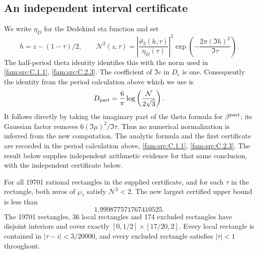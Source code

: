 \subsection{An independent interval certificate}\hypertarget{tag-034N}{}\label{push:section:E.4}
\label{sec:e4}

We write $\eta_D$ for the Dedekind eta function and set
\[
 h=z-(1-\tau)/2,\qquad
 \mathcal N^2(z,\tau)=
 \left|\frac{\vartheta_3(h,\tau)}{\eta_D(\tau)}\right|^2
 \exp\left(-\frac{2\pi(\Im h)^2}{\Im\tau}\right).
\]
The half-period theta identity identifies this with the norm used in
\cref{fam:src:C.1.1}, \cref{fam:src:C.2.3}. The coefficient of $\Im c$ in $D_c$ is one. Consequently the
identity from the period calculation above which we use is
\[
 D_{\rm part}=\frac6\pi
 \log\left(\frac{\mathcal N}{2\sqrt3}\right).
\]
It follows directly by taking the imaginary part of the theta formula
for $\beta^{\rm part}$; its Gaussian factor removes
$6(\Im\mu)^2/\Im\tau$. Thus no numerical normalization is inferred
from the new computation. The analytic formula and the first
certificate are recorded in the period calculation above, \cref{fam:src:C.1.1}, \cref{fam:src:C.2.3}. The result below supplies independent
arithmetic evidence for that same conclusion, with the independent certificate below.

\begin{theorem}\hypertarget{tag-033L}{}\label{push:src:E.4.1}



For all 19701 rational rectangles in the supplied certificate, and for
each $\tau$ in the rectangle, both zeros of $\wp_\tau$ satisfy
$\mathcal N^2<2$. The new largest certified upper bound is less than
\[
 1.999877571767410525.
\]
The 19701 rectangles, 36 local rectangles and 174 excluded rectangles
have disjoint interiors and cover exactly
$[0,1/2]\times[17/20,2]$. Every local rectangle is contained in
$|\tau-i|<3/20000$, and every excluded rectangle satisfies
$|\tau|<1$ throughout.
\end{theorem}



